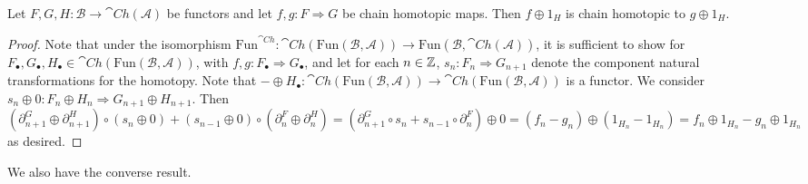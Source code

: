 \begin{lem}[label=lem:oplusPres]
    Let $F,G,H:\mathcal{B}\to \cat{Ch}(\mathcal{A})$ be functors and let $f,g:F\Rightarrow G$ be chain homotopic maps. Then $f\oplus 1_H$ is chain homotopic to $g\oplus 1_H$.
\end{lem}
\begin{proof}
    Note that under the isomorphism $\text{Fun}^{\cat{Ch}}:\cat{Ch}(\text{Fun}(\mathcal{B},\mathcal{A}))\to \text{Fun}(\mathcal{B},\cat{Ch}(\mathcal{A}))$, it is sufficient to show for $F_\bullet,G_\bullet,H_\bullet \in \cat{Ch}(\text{Fun}(\mathcal{B},\mathcal{A}))$, with $f,g:F_\bullet\Rightarrow G_\bullet$, and let for each $n \in \mathbb Z$, $s_n:F_n\Rightarrow G_{n+1}$ denote the component natural transformations for the homotopy. Note that $-\oplus H_\bullet:\cat{Ch}(\text{Fun}(\mathcal{B},\mathcal{A}))\to \cat{Ch}(\text{Fun}(\mathcal{B},\mathcal{A}))$ is a functor. We consider $s_n\oplus 0:F_n\oplus H_n\Rightarrow G_{n+1}\oplus H_{n+1}$. Then 
    \begin{equation*}
        (\partial_{n+1}^G\oplus \partial_{n+1}^H)\circ (s_n\oplus 0)+(s_{n-1}\oplus 0)\circ (\partial_n^F\oplus \partial_n^H) = (\partial_{n+1}^G\circ s_n+s_{n-1}\circ \partial_n^F)\oplus 0  = (f_n-g_n)\oplus (1_{H_n}-1_{H_n}) = f_n\oplus 1_{H_n}-g_n\oplus 1_{H_n}
    \end{equation*}
    as desired.
\end{proof}

We also have the converse result.

